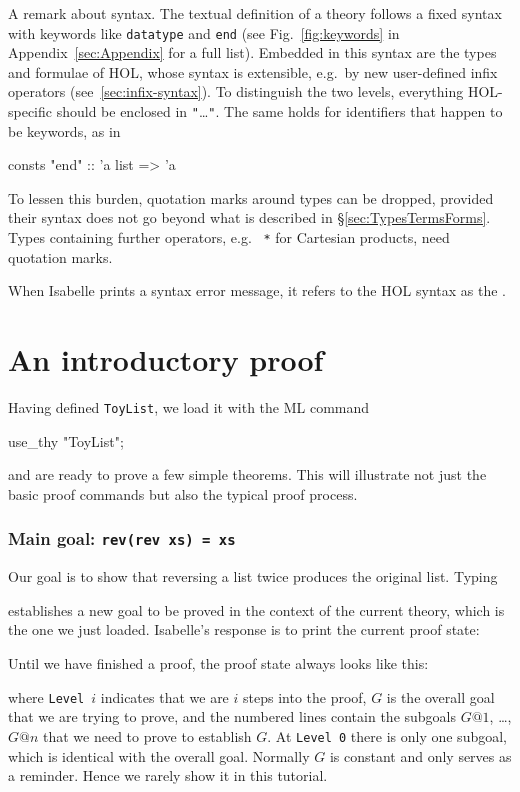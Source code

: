 A remark about syntax.  The textual definition of a theory follows a fixed
syntax with keywords like \texttt{datatype} and \texttt{end} (see
Fig.~\ref{fig:keywords} in Appendix~\ref{sec:Appendix} for a full list).
Embedded in this syntax are the types and formulae of HOL, whose syntax is
extensible, e.g.\ by new user-defined infix operators
(see~\ref{sec:infix-syntax}). To distinguish the two levels, everything
HOL-specific should be enclosed in \texttt{"}\dots\texttt{"}. The same holds
for identifiers that happen to be keywords, as in
\begin{ttbox}
consts "end" :: 'a list => 'a
\end{ttbox}
To lessen this burden, quotation marks around types can be dropped,
provided their syntax does not go beyond what is described in
\S\ref{sec:TypesTermsForms}. Types containing further operators, e.g.\
\label{startype} \texttt{*} for Cartesian products, need quotation marks.

When Isabelle prints a syntax error message, it refers to the HOL syntax as
the \bfindex{inner syntax}.

\section{An introductory proof}
\label{sec:intro-proof}

Having defined \texttt{ToyList}, we load it with the ML command
\begin{ttbox}
use_thy "ToyList";
\end{ttbox}
and are ready to prove a few simple theorems. This will illustrate not just
the basic proof commands but also the typical proof process.

\subsubsection*{Main goal: \texttt{rev(rev xs) = xs}}

Our goal is to show that reversing a list twice produces the original
list. Typing
\begin{ttbox}
\end{ttbox}
establishes a new goal to be proved in the context of the current theory,
which is the one we just loaded. Isabelle's response is to print the current proof state:
\begin{ttbox}
\end{ttbox}
Until we have finished a proof, the proof state always looks like this:
\begin{ttbox}
\Out{ \(\vdots\)}
\end{ttbox}
where \texttt{Level}~$i$ indicates that we are $i$ steps into the proof, $G$
is the overall goal that we are trying to prove, and the numbered lines
contain the subgoals $G@1$, \dots, $G@n$ that we need to prove to establish
$G$. At \texttt{Level 0} there is only one subgoal, which is identical with
the overall goal.  Normally $G$ is constant and only serves as a reminder.
Hence we rarely show it in this tutorial.

